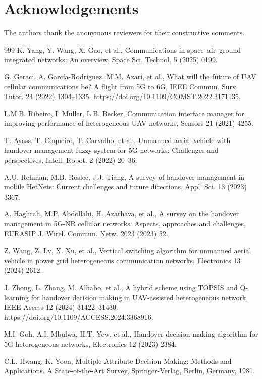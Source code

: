 \documentclass[preprint,12pt]{elsarticle}
\begin{document}
\section*{Acknowledgements}

The authors thank the anonymous reviewers for their constructive comments.

\begin{thebibliography}{999}
K. Yang, Y. Wang, X. Gao, et al., Communications in space--air--ground integrated networks: An overview, Space Sci. Technol. 5 (2025) 0199.

G. Geraci, A. García-Rodríguez, M.M. Azari, et al., What will the future of UAV cellular communications be? A flight from 5G to 6G, IEEE Commun. Surv. Tutor. 24 (2022) 1304--1335. https://doi.org/10.1109/COMST.2022.3171135.

L.M.B. Ribeiro, I. Müller, L.B. Becker, Communication interface manager for improving performance of heterogeneous UAV networks, Sensors 21 (2021) 4255.

T. Ayass, T. Coqueiro, T. Carvalho, et al., Unmanned aerial vehicle with handover management fuzzy system for 5G networks: Challenges and perspectives, Intell. Robot. 2 (2022) 20--36.

A.U. Rehman, M.B. Roslee, J.J. Tiang, A survey of handover management in mobile HetNets: Current challenges and future directions, Appl. Sci. 13 (2023) 3367.

A. Haghrah, M.P. Abdollahi, H. Azarhava, et al., A survey on the handover management in 5G-NR cellular networks: Aspects, approaches and challenges, EURASIP J. Wirel. Commun. Netw. 2023 (2023) 52.

Z. Wang, Z. Lv, X. Xu, et al., Vertical switching algorithm for unmanned aerial vehicle in power grid heterogeneous communication networks, Electronics 13 (2024) 2612.

J. Zhong, L. Zhang, M. Alhabo, et al., A hybrid scheme using TOPSIS and Q-learning for handover decision making in UAV-assisted heterogeneous network, IEEE Access 12 (2024) 31422--31430. https://doi.org/10.1109/ACCESS.2024.3368916.

M.I. Goh, A.I. Mbulwa, H.T. Yew, et al., Handover decision-making algorithm for 5G heterogeneous networks, Electronics 12 (2023) 2384.

C.L. Hwang, K. Yoon, Multiple Attribute Decision Making: Methods and Applications. A State-of-the-Art Survey, Springer-Verlag, Berlin, Germany, 1981.


\end{thebibliography}
\end{document}
